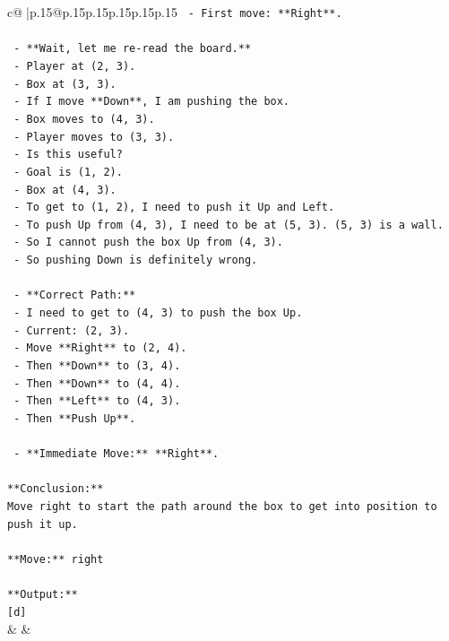 \documentclass{article}
\begin{document}
{\begin{supertabular}{c@{$\;$}|p{.15\linewidth}@{}p{.15\linewidth}p{.15\linewidth}p{.15\linewidth}p{.15\linewidth}p{.15\linewidth}}
{{{\texttt{        {-} First move: **Right**.} \\
\\ 
\texttt{    {-} **Wait, let me re{-}read the board.**} \\
\texttt{        {-} Player at (2, 3).} \\
\texttt{        {-} Box at (3, 3).} \\
\texttt{        {-} If I move **Down**, I am pushing the box.} \\
\texttt{        {-} Box moves to (4, 3).} \\
\texttt{        {-} Player moves to (3, 3).} \\
\texttt{        {-} Is this useful?} \\
\texttt{        {-} Goal is (1, 2).} \\
\texttt{        {-} Box at (4, 3).} \\
\texttt{        {-} To get to (1, 2), I need to push it Up and Left.} \\
\texttt{        {-} To push Up from (4, 3), I need to be at (5, 3). (5, 3) is a wall.} \\
\texttt{        {-} So I cannot push the box Up from (4, 3).} \\
\texttt{        {-} So pushing Down is definitely wrong.} \\
\\ 
\texttt{    {-} **Correct Path:**} \\
\texttt{        {-} I need to get to (4, 3) to push the box Up.} \\
\texttt{        {-} Current: (2, 3).} \\
\texttt{        {-} Move **Right** to (2, 4).} \\
\texttt{        {-} Then **Down** to (3, 4).} \\
\texttt{        {-} Then **Down** to (4, 4).} \\
\texttt{        {-} Then **Left** to (4, 3).} \\
\texttt{        {-} Then **Push Up**.} \\
\\ 
\texttt{    {-} **Immediate Move:** **Right**.} \\
\\ 
\texttt{**Conclusion:**} \\
\texttt{Move right to start the path around the box to get into position to push it up.} \\
\\ 
\texttt{**Move:** right} \\
\\ 
\texttt{**Output:**} \\
\texttt{{[}d{]}} \\
            }
        }
    }
    & & \\ \\


\end{supertabular}}
\end{document}
